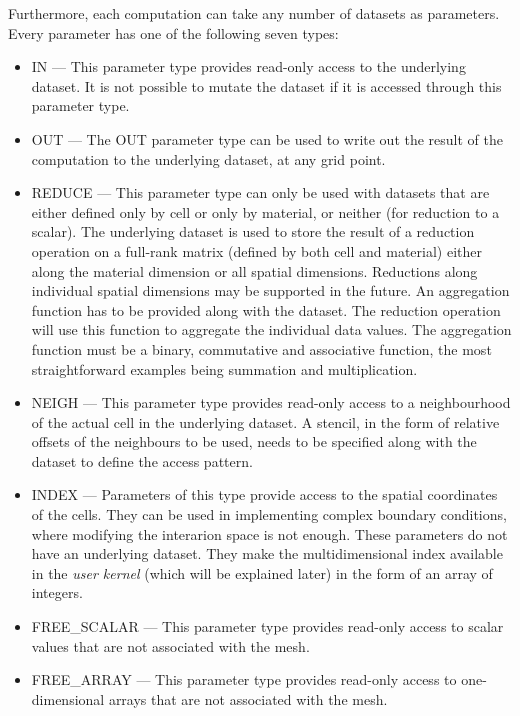 \documentclass[fontsize=11pt, appendixprefix=true]{scrreprt}
\begin{document}
Furthermore, each computation can take any number of datasets as parameters.
Every parameter has one of the following seven types:

\begin{itemize}
  \item IN --- This parameter type provides read-only access to the underlying
    dataset. It is not possible to mutate the dataset if it is accessed through
    this parameter type.
  \item OUT --- The OUT parameter type can be used to write out the result of
    the computation to the underlying dataset, at any grid point.
  \item REDUCE --- This parameter type can only be used with datasets that are
    either defined only by cell or only by material, or neither (for reduction
    to a scalar).  The underlying dataset is used to store the result of a
    reduction operation on a full-rank matrix (defined by both cell and
    material) either along the material dimension or all spatial
    dimensions. Reductions along individual spatial dimensions may be supported
    in the future. An aggregation function has to be provided along with the
    dataset. The reduction operation will use this function to aggregate the
    individual data values. The aggregation function must be a binary,
    commutative and associative function, the most straightforward examples
    being summation and multiplication.
  \item NEIGH --- This parameter type provides read-only access to a
    neighbourhood of the actual cell in the underlying dataset. A stencil, in
    the form of relative offsets of the neighbours to be used, needs to be
    specified along with the dataset to define the access pattern.
  \item INDEX --- Parameters of this type provide access to the spatial
    coordinates of the cells.  They can be used in implementing complex boundary
    conditions, where modifying the interarion space is not enough.  These
    parameters do not have an underlying dataset. They make the multidimensional
    index available in the \textit{user kernel} (which will be explained later)
    in the form of an array of integers.
  \item FREE\_SCALAR --- This parameter type provides read-only access to scalar
    values that are not associated with the mesh.
  \item FREE\_ARRAY --- This parameter type provides read-only access to
    one-dimensional arrays that are not associated with the mesh.
\end{itemize}
\end{document}
